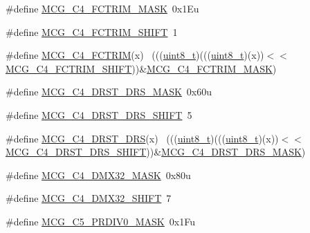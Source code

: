 \begin{DoxyCompactItemize}
\#define \hyperlink{group___m_c_g___register___masks_ga91610035649d14c5027419db0bfa3231}{M\+C\+G\+\_\+\+C4\+\_\+\+F\+C\+T\+R\+I\+M\+\_\+\+M\+A\+SK}~0x1\+Eu
\item 
\#define \hyperlink{group___m_c_g___register___masks_ga0a1b1f2be0b8e9afc3ff91ab11d71a1e}{M\+C\+G\+\_\+\+C4\+\_\+\+F\+C\+T\+R\+I\+M\+\_\+\+S\+H\+I\+FT}~1
\item 
\#define \hyperlink{group___m_c_g___register___masks_gae3b32644a70a2a5bf1a36f8dc0c09837}{M\+C\+G\+\_\+\+C4\+\_\+\+F\+C\+T\+R\+IM}(x)                                              ~(((\hyperlink{_p_e___types_8h_aba7bc1797add20fe3efdf37ced1182c5}{uint8\+\_\+t})(((\hyperlink{_p_e___types_8h_aba7bc1797add20fe3efdf37ced1182c5}{uint8\+\_\+t})(x))$<$$<$\hyperlink{group___m_c_g___register___masks_ga0a1b1f2be0b8e9afc3ff91ab11d71a1e}{M\+C\+G\+\_\+\+C4\+\_\+\+F\+C\+T\+R\+I\+M\+\_\+\+S\+H\+I\+FT}))\&\hyperlink{group___m_c_g___register___masks_ga91610035649d14c5027419db0bfa3231}{M\+C\+G\+\_\+\+C4\+\_\+\+F\+C\+T\+R\+I\+M\+\_\+\+M\+A\+SK})
\item 
\#define \hyperlink{group___m_c_g___register___masks_ga7f6629e8d17efb2cec3d2f63d09ede5a}{M\+C\+G\+\_\+\+C4\+\_\+\+D\+R\+S\+T\+\_\+\+D\+R\+S\+\_\+\+M\+A\+SK}~0x60u
\item 
\#define \hyperlink{group___m_c_g___register___masks_ga27d4baa0c8a770f1f67ab47e6407e948}{M\+C\+G\+\_\+\+C4\+\_\+\+D\+R\+S\+T\+\_\+\+D\+R\+S\+\_\+\+S\+H\+I\+FT}~5
\item 
\#define \hyperlink{group___m_c_g___register___masks_ga4cba7b614163bf1244629a1006509c37}{M\+C\+G\+\_\+\+C4\+\_\+\+D\+R\+S\+T\+\_\+\+D\+RS}(x)                                          ~(((\hyperlink{_p_e___types_8h_aba7bc1797add20fe3efdf37ced1182c5}{uint8\+\_\+t})(((\hyperlink{_p_e___types_8h_aba7bc1797add20fe3efdf37ced1182c5}{uint8\+\_\+t})(x))$<$$<$\hyperlink{group___m_c_g___register___masks_ga27d4baa0c8a770f1f67ab47e6407e948}{M\+C\+G\+\_\+\+C4\+\_\+\+D\+R\+S\+T\+\_\+\+D\+R\+S\+\_\+\+S\+H\+I\+FT}))\&\hyperlink{group___m_c_g___register___masks_ga7f6629e8d17efb2cec3d2f63d09ede5a}{M\+C\+G\+\_\+\+C4\+\_\+\+D\+R\+S\+T\+\_\+\+D\+R\+S\+\_\+\+M\+A\+SK})
\item 
\#define \hyperlink{group___m_c_g___register___masks_ga5d16ac35cf87b3cdeeefca1c16a0eda0}{M\+C\+G\+\_\+\+C4\+\_\+\+D\+M\+X32\+\_\+\+M\+A\+SK}~0x80u
\item 
\#define \hyperlink{group___m_c_g___register___masks_ga12d73b2d4a4fd1f2fb21a1cbe87aaa83}{M\+C\+G\+\_\+\+C4\+\_\+\+D\+M\+X32\+\_\+\+S\+H\+I\+FT}~7
\item 
\#define \hyperlink{group___m_c_g___register___masks_ga28ab0b9007f9941707395660db088172}{M\+C\+G\+\_\+\+C5\+\_\+\+P\+R\+D\+I\+V0\+\_\+\+M\+A\+SK}~0x1\+Fu

\end{DoxyCompactItemize}
